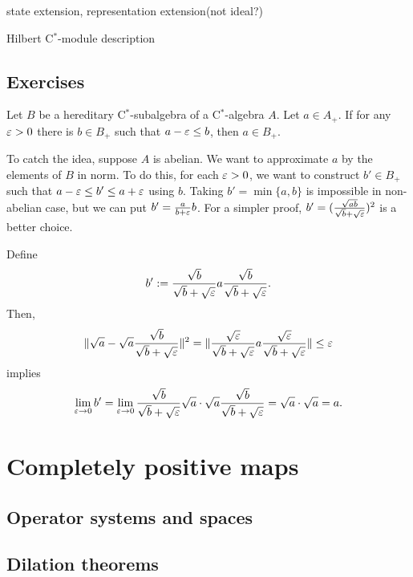 \documentclass{../../large}
\begin{document}
\begin{prb}
state extension, representation extension(not ideal?)
\end{prb}



\begin{prb}
\begin{parts}
\item Hilbert C$^*$-module description
\end{parts}
\end{prb}


\section*{Exercises}
\begin{prb}
Let $B$ be a hereditary C$^*$-subalgebra of a C$^*$-algebra $A$.
Let $a\in A_+$.
If for any $\varepsilon>0$ there is $b\in B_+$ such that $a-\varepsilon\le b$, then $a\in B_+$.
\end{prb}
\begin{pf}
To catch the idea, suppose $A$ is abelian.
We want to approximate $a$ by the elements of $B$ in norm.
To do this, for each $\varepsilon>0$, we want to construct $b'\in B_+$ such that $a-\varepsilon\le b'\le a+\varepsilon$ using $b$.
Taking $b'=\min\{a,b\}$ is impossible in non-abelian case, but we can put $b'=\frac a{b+\varepsilon}b$.
For a simpler proof, $b'=(\frac{\sqrt{ab}}{\sqrt b+\sqrt{\varepsilon}})^2$ is a better choice.

Define
\[b':=\frac{\sqrt b}{\sqrt b+\sqrt{\varepsilon}}a\frac{\sqrt b}{\sqrt b+\sqrt{\varepsilon}}.\]
Then,
\[\|\sqrt a-\sqrt a\frac{\sqrt b}{\sqrt b+\sqrt{\varepsilon}}\|^2=\|\frac{\sqrt{\varepsilon}}{\sqrt b+\sqrt{\varepsilon}}a\frac{\sqrt{\varepsilon}}{\sqrt b+\sqrt{\varepsilon}}\|\le\varepsilon\]
implies
\[\lim_{\varepsilon\to0}b'=\lim_{\varepsilon\to0}\frac{\sqrt b}{\sqrt b+\sqrt{\varepsilon}}\sqrt a\cdot\sqrt a\frac{\sqrt b}{\sqrt b+\sqrt{\varepsilon}}=\sqrt a\cdot\sqrt a=a.\]
\end{pf}


\chapter{Completely positive maps}

\section{Operator systems and spaces}

\section{Dilation theorems}
\end{document}
